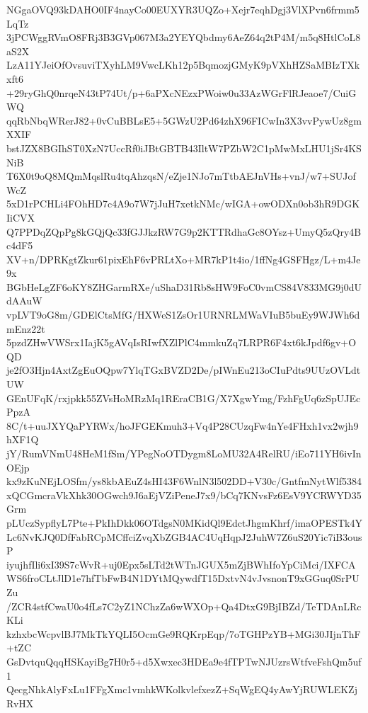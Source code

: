 NGgaOVQ93kDAHO0IF4nayCo00EUXYR3UQZo+Xejr7eqhDgj3VlXPvn6frmm5LqTz
3jPCWggRVmO8FRj3B3GVp067M3a2YEYQbdmy6AeZ64q2tP4M/m5q8HtlCoL8aS2X
LzA11YJeiOfOvsuviTXyhLM9VwcLKh12p5BqmozjGMyK9pVXhHZSaMBIzTXkxft6
+29ryGhQ0nrqeN43tP74Ut/p+6aPXcNEzxPWoiw0u33AzWGrFlRJeaoe7/CuiGWQ
qqRbNbqWRerJ82+0vCuBBLsE5+5GWzU2Pd64zhX96FICwIn3X3vvPywUz8gmXXIF
bstJZX8BGIhST0XzN7UccRf0iJBtGBTB43IltW7PZbW2C1pMwMxLHU1jSr4KSNiB
T6X0t9oQ8MQmMqslRu4tqAhzqsN/eZje1NJo7mTtbAEJnVHs+vnJ/w7+SUJofWcZ
5xD1rPCHLi4FOhHD7c4A9o7W7jJuH7xetkNMc/wIGA+owODXn0ob3hR9DGKIiCVX
Q7PPDqZQpPg8kGQjQc33fGJJkzRW7G9p2KTTRdhaGc8OYsz+UmyQ5zQry4Bc4dF5
XV+n/DPRKgtZkur61pixEhF6vPRLtXo+MR7kP1t4io/1ffNg4GSFHgz/L+m4Je9x
BGbHeLgZF6oKY8ZHGarmRXe/uShaD31Rb8sHW9FoC0vmCS84V833MG9j0dUdAAuW
vpLVT9oG8m/GDElCtsMfG/HXWeS1ZsOr1URNRLMWaVIuB5buEy9WJWh6dmEnz22t
5pzdZHwVWSrx1IajK5gAVqIsRIwfXZlPlC4mmkuZq7LRPR6F4xt6kJpdf6gv+OQD
je2fO3Hjn4AxtZgEuOQpw7YlqTGxBVZD2De/pIWnEu213oCIuPdts9UUzOVLdtUW
GEnUFqK/rxjpkk55ZVsHoMRzMq1REraCB1G/X7XgwYmg/FzhFgUq6zSpUJEcPpzA
8C/t+uuJXYQaPYRWx/hoJFGEKmuh3+Vq4P28CUzqFw4nYe4FHxh1vx2wjh9hXF1Q
jY/RumVNmU48HeM1fSm/YPegNoOTDygm8LoMU32A4RelRU/iEo711YH6ivInOEjp
kx9zKuNEjLOSfm/ys8kbAEuZ4sHI43F6WnlN3l502DD+V30c/GntfmNytWlf5384
xQCGmcraVkXhk30OGwch9J6aEjVZiPeneJ7x9/bCq7KNvsFz6EsV9YCRWYD35Grm
pLUczSypflyL7Pte+PkIhDkk06OTdgsN0MKidQl9EdctJhgmKhrf/imaOPESTk4Y
Lc6NvKJQ0DfFabRCpMCffciZvqXbZGB4AC4UqHqpJ2JuhW7Z6uS20Yic7iB3ousP
iyujhfIli6xI39S7cWvR+uj0Epx5sLTd2tWTnJGUX5mZjBWhIfoYpCiMci/IXFCA
WS6froCLtJlD1e7hfTbFwB4N1DYtMQywdfT15DxtvN4vJvsnonT9xGGuq0SrPUZu
/ZCR4stfCwaU0o4fLs7C2yZ1NChzZa6wWXOp+Qa4DtxG9BjIBZd/TeTDAnLRcKLi
kzhxbcWcpvlBJ7MkTkYQLI5OcmGe9RQKrpEqp/7oTGHPzYB+MGi30JIjnThF+tZC
GsDvtquQqqHSKayiBg7H0r5+d5Xwxec3HDEa9e4fTPTwNJUzrsWtfveFshQm5uf1
QecgNhkAlyFxLu1FFgXmc1vmhkWKolkvlefxezZ+SqWgEQ4yAwYjRUWLEKZjRvHX
